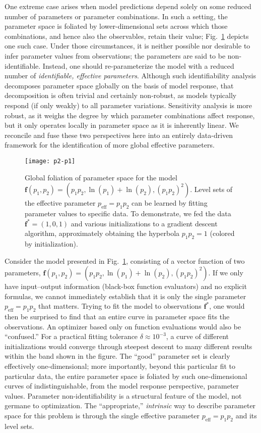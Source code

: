 One extreme case arises when model predictions depend solely on some
reduced number of parameters or parameter combinations.  In such a
setting, the parameter space is foliated by lower-dimensional sets
across which those combinations, and hence also the observables,
retain their value; Fig.~\ref{fig:non-id} depicts one such case.
Under those circumstances, it is neither possible nor desirable to
infer parameter values from observations; the parameters are said to
be non-identifiable. Instead, one should re-parameterize the model
with a reduced number of \emph{identifiable, effective parameters}.
Although such identifiability analysis decomposes parameter space
globally on the basis of model response, that decomposition is often
trivial and certainly non-robust, as models typically respond (if only
weakly) to all parameter variations.  Sensitivity analysis is more
robust, as it weighs the degree by which parameter combinations affect
response, but it only operates locally in parameter space as it is
inherently linear. We reconcile and fuse these two perspectives here
into an entirely data-driven framework for the identification of more
global effective parameters.

\begin{figure}
  \centerline{\texttt{[image: p2-p1]}}
  \caption[Illustration of effects of sloppiness on optimization]{Global foliation of parameter space for the model
    $\mathbf{f}(p_1,p_2) = (p_1 p_2 , \ln(p_1) + \ln(p_2) , (p_1 p_2)^2)$.
    Level sets of the effective parameter $p_\mathrm{eff} = p_1 p_2$
    can be learned by fitting parameter values to specific data.
    To demonstrate, we fed the data $\mathbf{f}^*=(1,0,1)$ and various initializations 
    to a gradient descent algorithm, approximately obtaining the hyperbola $p_1 p_2 = 1$ (colored by initialization).
    \label{fig:non-id} }
\end{figure}

Consider the model presented in Fig.~\ref{fig:non-id}, consisting of a
vector function of two parameters,
$\mathbf{f}(p_1,p_2) = (p_1 p_2 , \ln(p_1) + \ln(p_2) , (p_1 p_2)^2)$.
If we only have input--output information (black-box function
evaluators) and no explicit formulas, we cannot immediately establish
that it is only the single parameter $p_\mathrm{eff}=p_1 p_2$ that
matters.  Trying to fit the model to observations $\mathbf{f}^*$, one
would then be surprised to find that an entire curve in parameter
space fits the observations.  An optimizer based only on function
evaluations would also be ``confused.''  For a practical fitting
tolerance $\delta\approx10^{-3}$, a curve of different initializations
would converge through steepest descent to many different results
within the band shown in the figure.  The ``good'' parameter set is
clearly effectively one-dimensional; more importantly, beyond this
particular fit to particular data, the entire parameter space is
foliated by such one-dimensional curves of indistinguishable, from the
model response perspective, parameter values.  Parameter
non-identifiability is a structural feature of the model, not germane
to optimization.  The ``appropriate,'' \emph{intrinsic} way to
describe parameter space for this problem is through the single
effective parameter $p_\mathrm{eff}=p_1 p_2$ and its level sets.

